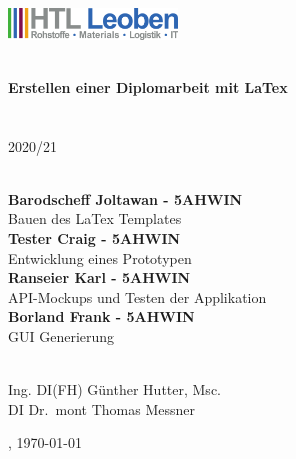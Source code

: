 \documentclass[
    headings=optiontotocandhead,%
    twoside,
    numbers=noenddot,%
    12pt, %
    titlepage, %
    parskip=full, %
    listof=leveldown, 
    numbers=noenddot, %
    a4paper,DIV=14,
    BCOR=15mm,
]{scrbook}
\begin{document}
\frontmatter %
\title{}
\begin{titlepage}

\begin{center}

\includegraphics[width=45mm]{style/HTLLE-Logo.png}

\vspace{2cm}
\textbf{\LARGE{}}{\large{}}\\
{\large{}\vspace{15mm}
 \textbf{\large{}
Erstellen einer Diplomarbeit mit LaTex
}\\

 \vspace{15mm}
  \\
  \\
 \vspace{1cm}
2020/21
\\
 \vspace{1cm}
 \\
 \vspace{0.5cm}
}

\textbf{Barodscheff Joltawan - 5AHWIN} \\ 
Bauen des LaTex Templates
\vspace{5mm}
\\ \textbf{Tester Craig - 5AHWIN} \\ 
Entwicklung eines Prototypen
\vspace{5mm}
\\ \textbf{Ranseier Karl - 5AHWIN} \\ 
API-Mockups und Testen der Applikation
\vspace{5mm}
\\ \textbf{Borland Frank - 5AHWIN} \\ 
GUI Generierung
\vspace{5mm}


\par\end{center}{\large \par}

\begin{center}
 \normalsize {} \\
 \vspace{0.5cm}
Ing. DI(FH) Günther Hutter, Msc.\\ DI Dr.~mont Thomas Messner

\par\end{center}

\begin{center}
\vspace{5mm}
, \today 
\par\end{center}
\end{titlepage}
\end{document}
